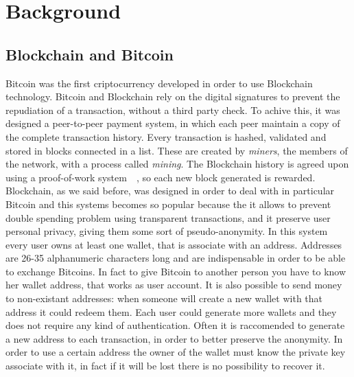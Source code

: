 \section{Background}
\subsection{Blockchain and Bitcoin}
Bitcoin was the first criptocurrency developed in order to use Blockchain
technology. Bitcoin and Blockchain rely on the digital signatures
to prevent the repudiation of a transaction, without a third party check.
To achive this, it was designed a peer-to-peer payment system, in which each
peer maintain a copy of the complete transaction history. Every transaction is
hashed, validated and stored in blocks connected in a list. These are created
by \textit{miners}, the members of the network, with a process called
\textit{mining}. The Blockchain history is agreed upon using a proof-of-work
system~\cite{pricing}~\cite{hashcash}, so each new block generated is rewarded.
Blockchain, as we said before, was designed in order to deal with
in particular Bitcoin and this systems becomes so popular because the it allows
to prevent double spending problem using transparent transactions, and it
preserve user personal privacy, giving them some sort of pseudo-anonymity.
In this system every user owns at least one wallet, that is associate with an
address. Addresses are 26-35 alphanumeric characters long and are indispensable
in order to be able to exchange Bitcoins. In fact to give Bitcoin to another
person you have to know her wallet address, that works as user account. It is
also possible to send money to non-existant addresses: when someone will create
a new wallet with that address it could redeem them. Each user could generate
more wallets and they does not require any kind of authentication. Often it is
raccomended to generate a new address to each transaction, in order to better
preserve the anonymity\cite{satoshi}. In order to use a certain address the
owner of the wallet must know the private key associate with it, in fact if it
will be lost there is no possibility to recover it. 


